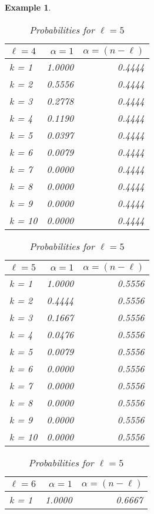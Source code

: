 \documentclass{article}
\newtheorem{example}{Example} %
\begin{document}
\begin{example}
\begin{table}[H]
\begin{minipage}{0.33\textwidth}
\small
\begin{tabular}{lrr}
\hline
$\ell=4$ & $\alpha = 1$ & $\alpha = (n-\ell)$ \\
\hline
k = 1  &     1.0000 &         0.4444 \\
k = 2  &     0.5556 &         0.4444 \\
k = 3  &     0.2778 &         0.4444 \\
k = 4  &     0.1190 &         0.4444 \\
k = 5  &     0.0397 &         0.4444 \\
k = 6  &     0.0079 &         0.4444 \\
k = 7  &     0.0000 &         0.4444 \\
k = 8  &     0.0000 &         0.4444 \\
k = 9  &     0.0000 &         0.4444 \\
k = 10 &     0.0000 &         0.4444 \\
\hline
\end{tabular}
\caption{Probabilities for $\ell=4$}
\end{minipage}\hfill
\centering
\begin{minipage}{0.33\textwidth}
\small
\begin{tabular}{lrr}
\hline
$\ell=5$ & $\alpha = 1$ & $\alpha = (n-\ell)$ \\
\hline
k = 1  &     1.0000 &         0.5556 \\
k = 2  &     0.4444 &         0.5556 \\
k = 3  &     0.1667 &         0.5556 \\
k = 4  &     0.0476 &         0.5556 \\
k = 5  &     0.0079 &         0.5556 \\
k = 6  &     0.0000 &         0.5556 \\
k = 7  &     0.0000 &         0.5556 \\
k = 8  &     0.0000 &         0.5556 \\
k = 9  &     0.0000 &         0.5556 \\
k = 10 &     0.0000 &         0.5556 \\
\hline
\end{tabular}
\caption{Probabilities for $\ell=5$}
\end{minipage}\hfill
\centering
\begin{minipage}{0.33\textwidth}
\small
\begin{tabular}{lrr}
\hline
$\ell=6$ & $\alpha = 1$ & $\alpha = (n-\ell)$ \\
\hline
k = 1  &     1.0000 &         0.6667 \\

\end{tabular}
\end{minipage}
\end{table}
\end{example}
\end{document}
